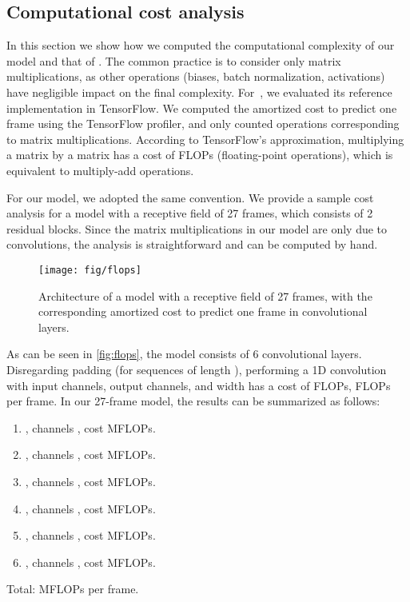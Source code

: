 \documentclass[10pt,twocolumn,letterpaper]{article}
\begin{document}
\subsection{Computational cost analysis}
\label{app:complexity}

In this section we show how we computed the computational complexity of our model and that of \cite{hossain:exploiting:2018}. 
The common practice is to consider only matrix multiplications, as other operations (\eg biases, batch normalization, activations) have negligible impact on the final complexity. 
For~\cite{hossain:exploiting:2018}, we evaluated its reference implementation in TensorFlow. 
We computed the amortized cost to predict one frame using the TensorFlow profiler, and only counted operations corresponding to matrix multiplications. 
According to TensorFlow's approximation, multiplying a  matrix by a  matrix has a cost of  FLOPs (floating-point operations), which is equivalent to  multiply-add operations.

For our model, we adopted the same convention. 
We provide a sample cost analysis for a model with a receptive field of 27 frames, which consists of 2 residual blocks. 
Since the matrix multiplications in our model are only due to convolutions, the analysis is straightforward and can be computed by hand.

\begin{figure}[h]
	\centering
	\texttt{[image: fig/flops]}
	\caption{Architecture of a model with a receptive field of 27 frames, with the corresponding amortized cost to predict one frame in convolutional layers.}
	\label{fig:flops}
\end{figure}

As can be seen in \autoref{fig:flops}, the model consists of 6 convolutional layers. Disregarding padding (\ie for sequences of length ), performing a 1D convolution with  input channels,  output channels, and width  has a cost of  FLOPs, \ie  FLOPs per frame. In our 27-frame model, the results can be summarized as follows:
\begin{enumerate}
    \item , channels , cost  MFLOPs.
    \item , channels , cost  MFLOPs.
    \item , channels , cost  MFLOPs.
    \item , channels , cost  MFLOPs.
    \item , channels , cost  MFLOPs.
    \item , channels , cost  MFLOPs.
\end{enumerate}
Total:  MFLOPs per frame.
\end{document}
